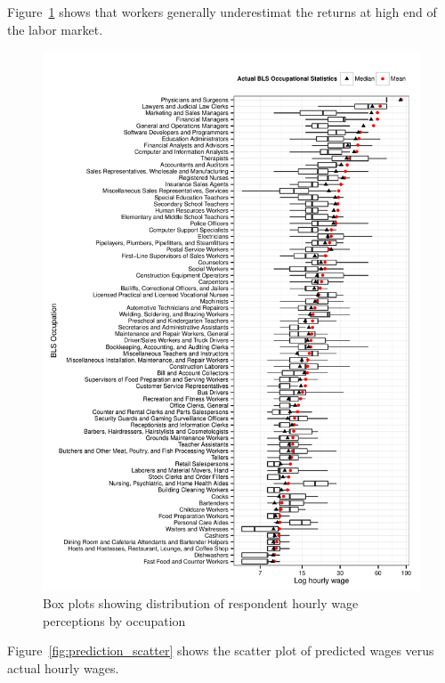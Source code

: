 \documentclass[11pt]{article}
\begin{document}
Figure~\ref{fig:by_occupation_boxplots} shows that workers generally underestimat the returns at high end of the labor market. 

\begin{figure}
\caption{Box plots showing distribution of respondent hourly wage perceptions by occupation \label{fig:by_occupation_boxplots}} 
\centering 
\includegraphics[width = \linewidth]{./plots/box_plots_by_occupation.pdf} 
\end{figure} 

Figure~\ref{fig:prediction_scatter} shows the scatter plot of predicted wages verus actual hourly wages. 
\end{document}
